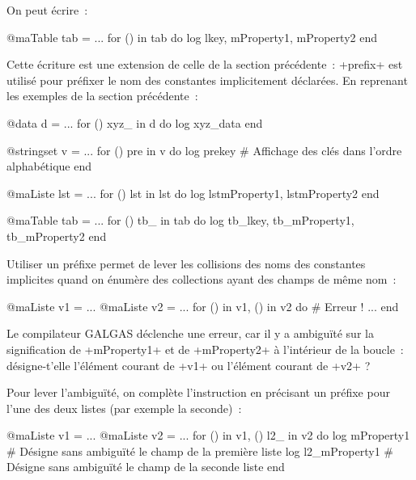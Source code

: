 On peut écrire~:

\begin{galgas3}
@maTable tab = ...
for () in tab do
  log lkey, mProperty1, mProperty2
end
\end{galgas3}



Cette écriture est une extension de celle de la section précédente~: \ggst+prefix+ est utilisé pour préfixer le nom des constantes implicitement déclarées. En reprenant les exemples de la section précédente~:

\begin{galgas3}
@data d = ...
for () xyz_ in d do
  log xyz_data
end
\end{galgas3}



\begin{galgas3}
@stringset v = ...
for () pre in v do
  log prekey # Affichage des clés dans l'ordre alphabétique
end
\end{galgas3}


\begin{galgas3}
@maListe lst = ...
for () lst in lst do
  log lstmProperty1, lstmProperty2
end
\end{galgas3}


\begin{galgas3}
@maTable tab = ...
for () tb_ in tab do
  log tb_lkey, tb_mProperty1, tb_mProperty2
end
\end{galgas3}

Utiliser un préfixe permet de lever les collisions des noms des constantes implicites quand on énumère des collections ayant des champs de même nom~:

\begin{galgas3}
@maListe v1 = ...
@maListe v2 = ...
for () in v1, () in v2 do # Erreur !
 ...
end
\end{galgas3}

Le compilateur GALGAS déclenche une erreur, car il y a ambiguïté sur la signification de \ggst+mProperty1+ et de \ggst+mProperty2+ à l'intérieur de la boucle~: désigne-t'elle l'élément courant de \ggst+v1+ ou l'élément courant de \ggst+v2+ ?

Pour lever l'ambiguïté, on complète l'instruction en précisant un préfixe pour l'une des deux listes (par exemple la seconde)~:
\begin{galgas3}
@maListe v1 = ...
@maListe v2 = ...
for () in v1, () l2_ in v2 do
  log mProperty1 # Désigne sans ambiguïté le champ de la première liste
  log l2_mProperty1 # Désigne sans ambiguïté le champ de la seconde liste
end
\end{galgas3}


